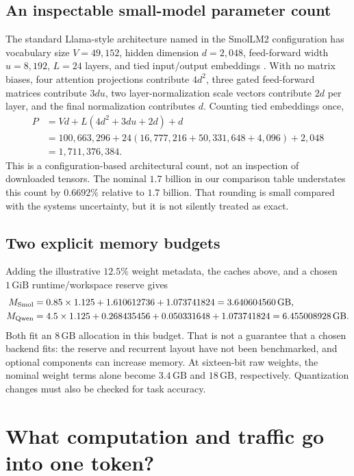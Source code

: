 \documentclass[11pt]{article}
\newcommand{\GB}{\,\mathrm{GB}}
\newcommand{\GiB}{\,\mathrm{GiB}}
\begin{document}
\subsection{An inspectable small-model parameter count}
The standard Llama-style architecture named in the SmolLM2 configuration has vocabulary size $V=49{,}152$, hidden dimension $d=2{,}048$, feed-forward width $u=8{,}192$, $L=24$ layers, and tied input/output embeddings \citep{smol}. With no matrix biases, four attention projections contribute $4d^2$, three gated feed-forward matrices contribute $3du$, two layer-normalization scale vectors contribute $2d$ per layer, and the final normalization contributes $d$. Counting tied embeddings once,
\begin{align}
P&=Vd+L(4d^2+3du+2d)+d\\
&=100{,}663{,}296+24(16{,}777{,}216+50{,}331{,}648+4{,}096)+2{,}048\\
&=1{,}711{,}376{,}384.
\end{align}
This is a configuration-based architectural count, not an inspection of downloaded tensors. The nominal $1.7$ billion in our comparison table understates this count by $0.6692\%$ relative to $1.7$ billion. That rounding is small compared with the systems uncertainty, but it is not silently treated as exact.

\subsection{Two explicit memory budgets}
Adding the illustrative $12.5\%$ weight metadata, the caches above, and a chosen $1\GiB$ runtime/workspace reserve gives
\begin{align}
M_{\rm Smol}&=0.85\times1.125+1.610612736+1.073741824
 =3.640604560\GB,\\
M_{\rm Qwen}&=4.5\times1.125+0.268435456+0.050331648+1.073741824
 =6.455008928\GB.
\end{align}
Both fit an $8\GB$ allocation in this budget. That is not a guarantee that a chosen backend fits: the reserve and recurrent layout have not been benchmarked, and optional components can increase memory. At sixteen-bit raw weights, the nominal weight terms alone become $3.4\GB$ and $18\GB$, respectively. Quantization changes must also be checked for task accuracy.

\section{What computation and traffic go into one token?}
\end{document}
